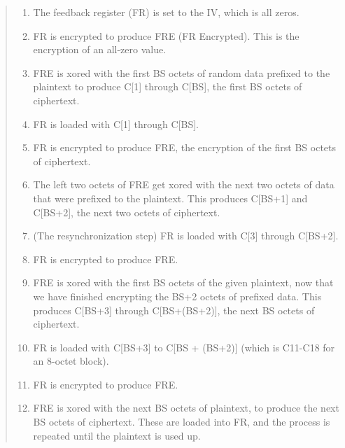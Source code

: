 \documentclass{article}
\begin{document}
\begin{quote}
\begin{enumerate}

\item The feedback register (FR) is set to the IV, which is all zeros.

\item FR is encrypted to produce FRE (FR Encrypted).
      This is the encryption of an all-zero value.

\item FRE is xored with the first BS octets of random data prefixed to the plaintext
      to produce C[1] through C[BS], the first BS octets of ciphertext.

\item FR is loaded with C[1] through C[BS].

\item FR is encrypted to produce FRE,
      the encryption of the first BS octets of ciphertext.

\item The left two octets of FRE get xored with the next two octets of
      data that were prefixed to the plaintext.  This produces C[BS+1]
      and C[BS+2], the next two octets of ciphertext.

\item (The resynchronization step) FR is loaded with C[3] through C[BS+2].

\item FR is encrypted to produce FRE.

\item FRE is xored with the first BS octets of the given plaintext, now
      that we have finished encrypting the BS+2 octets of prefixed data.
      This produces C[BS+3] through C[BS+(BS+2)], the next BS octets of ciphertext.

\item FR is loaded with C[BS+3] to C[BS + (BS+2)] (which is C11-C18 for an 8-octet block).

\item FR is encrypted to produce FRE.

\item FRE is xored with the next BS octets of plaintext, to produce
      the next BS octets of ciphertext.  These are loaded into FR, and
      the process is repeated until the plaintext is used up.

\end{enumerate}
\end{quote}
\end{document}
